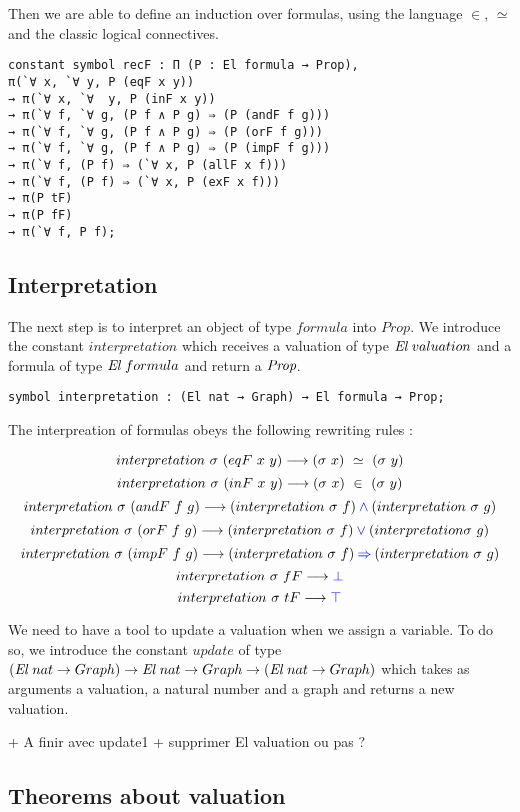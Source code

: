 \documentclass[a4paper]{article}
\begin{document}
Then we are able to define an induction over formulas, using the language $\in$, $\simeq$ and the classic logical connectives.

\begin{lstlisting}
constant symbol recF : Π (P : El formula → Prop), 
π(`∀ x, `∀ y, P (eqF x y))
→ π(`∀ x, `∀  y, P (inF x y))
→ π(`∀ f, `∀ g, (P f ∧ P g) ⇒ (P (andF f g)))
→ π(`∀ f, `∀ g, (P f ∧ P g) ⇒ (P (orF f g)))
→ π(`∀ f, `∀ g, (P f ∧ P g) ⇒ (P (impF f g)))
→ π(`∀ f, (P f) ⇒ (`∀ x, P (allF x f)))
→ π(`∀ f, (P f) ⇒ (`∀ x, P (exF x f)))
→ π(P tF)
→ π(P fF)
→ π(`∀ f, P f);
\end{lstlisting}

\subsection{Interpretation}

The next step is to interpret an object of type $formula$ into $Prop$. We introduce the constant $interpretation$ which receives a valuation of type $\El \ valuation$ and a formula of type $\El \ formula$ and return a ${\mbox{\it Prop}}$.

\begin{lstlisting}
symbol interpretation : (El nat → Graph) → El formula → Prop;
\end{lstlisting}

The interpreation of formulas obeys the following rewriting rules :

$$interpretation \ \sigma \ (eqF \ x \ y) \longrightarrow (\sigma \ x) \ \simeq \ (\sigma \ y)$$
$$interpretation \ \sigma \ (inF \ x \ y) \longrightarrow (\sigma \ x) \ \in \ (\sigma \ y)$$
$$interpretation \ \sigma \ (andF \ f \ g) \lra (interpretation \ \sigma \ f) \conj (interpretation \ \sigma \ g)$$
$$interpretation \ \sigma \ (orF \ f \ g) \longrightarrow (interpretation \ \sigma \ f) \mathbin{\color{blue} \vee}  (interpretation \sigma \ g)$$
$$interpretation \ \sigma \ (impF \ f \ g) \lra (interpretation \ \sigma \ f) \imp (interpretation \ \sigma \ g)$$
$$interpretation \ \sigma \ fF \longrightarrow {\color{blue} \bot}$$
$$interpretation \ \sigma \ tF \longrightarrow {\color{blue} \top}$$

We need to have a tool to update a valuation when we assign a variable. To do so, we introduce the constant $update$ of type $({\mbox{\it El}} \ nat \rightarrow Graph) \rightarrow {\mbox{\it El}} \ nat \rightarrow Graph \rightarrow ({\mbox{\it El}} \ nat \rightarrow Graph)$ which takes as arguments a valuation, a natural number and a graph and returns a new valuation. 

+ A finir avec update1
+ supprimer El valuation ou pas ?

\subsection{Theorems about valuation}
\end{document}

